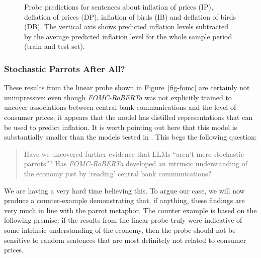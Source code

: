 \documentclass{article}
\theoremstyle{plain}
\theoremstyle{definition}
\theoremstyle{remark}
\begin{document}
\begin{figure}


\caption{\label{fig-attack}Probe predictions for sentences about
inflation of prices (IP), deflation of prices (DP), inflation of birds
(IB) and deflation of birds (DB). The vertical axis shows predicted
inflation levels subtracted by the average predicted inflation level for
the whole sample period (train and test set).}

\end{figure}%

\subsubsection{Stochastic Parrots After
All?}\label{stochastic-parrots-after-all}

These results from the linear probe shown in Figure~\ref{fig-fomc} are
certainly not unimpressive: even though \emph{FOMC-RoBERTa} was not
explicitly trained to uncover associations between central bank
communications and the level of consumer prices, it appears that the
model has distilled representations that can be used to predict
inflation. It is worth pointing out here that this model is
substantially smaller than the models tested in \cite{gurnee2023language}. This begs the following question:

\begin{quote}
Have we uncovered further evidence that LLMs ``aren't mere stochastic
parrots''? Has \emph{FOMC-RoBERTa} developed an intrinsic understanding
of the economy just by `reading' central bank communications?
\end{quote}

We are having a very hard time believing this. To argue our case, we will now produce a counter-example demonstrating that, if anything, these findings are very much in line with the parrot metaphor. The counter example is based on the following premise: if the results from the linear probe truly were indicative of some intrinsic understanding of the economy, then the probe should not be sensitive to random sentences  that are most definitely not related to consumer prices.
\end{document}
